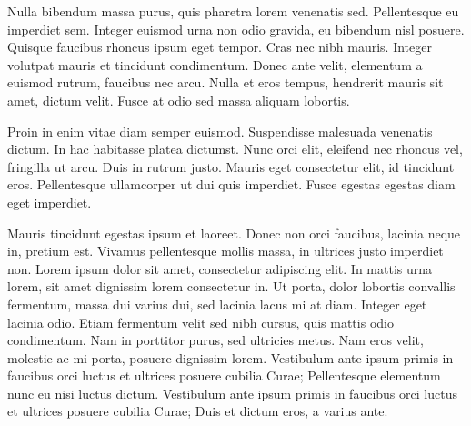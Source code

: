 Nulla bibendum massa purus, quis pharetra lorem venenatis sed. Pellentesque eu imperdiet sem. Integer euismod urna non odio gravida, eu bibendum nisl posuere. Quisque faucibus rhoncus ipsum eget tempor. Cras nec nibh mauris. Integer volutpat mauris et tincidunt condimentum. Donec ante velit, elementum a euismod rutrum, faucibus nec arcu. Nulla et eros tempus, hendrerit mauris sit amet, dictum velit. Fusce at odio sed massa aliquam lobortis.

Proin in enim vitae diam semper euismod. Suspendisse malesuada venenatis dictum. In hac habitasse platea dictumst. Nunc orci elit, eleifend nec rhoncus vel, fringilla ut arcu. Duis in rutrum justo. Mauris eget consectetur elit, id tincidunt eros. Pellentesque ullamcorper ut dui quis imperdiet. Fusce egestas egestas diam eget imperdiet.

Mauris tincidunt egestas ipsum et laoreet. Donec non orci faucibus, lacinia neque in, pretium est. Vivamus pellentesque mollis massa, in ultrices justo imperdiet non. Lorem ipsum dolor sit amet, consectetur adipiscing elit. In mattis urna lorem, sit amet dignissim lorem consectetur in. Ut porta, dolor lobortis convallis fermentum, massa dui varius dui, sed lacinia lacus mi at diam. Integer eget lacinia odio. Etiam fermentum velit sed nibh cursus, quis mattis odio condimentum. Nam in porttitor purus, sed ultricies metus. Nam eros velit, molestie ac mi porta, posuere dignissim lorem. Vestibulum ante ipsum primis in faucibus orci luctus et ultrices posuere cubilia Curae; Pellentesque elementum nunc eu nisi luctus dictum. Vestibulum ante ipsum primis in faucibus orci luctus et ultrices posuere cubilia Curae; Duis et dictum eros, a varius ante.